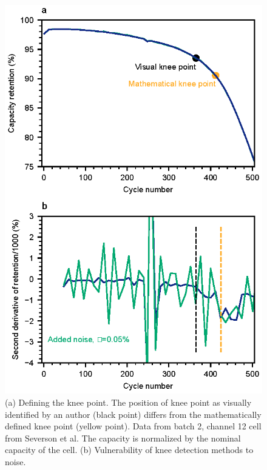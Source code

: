 \documentclass[journal=jpcl, manuscript=article, layout=onecolumn]{achemso}
\begin{document}
\begin{figure}[ht]
\centering
\includegraphics[scale=1]{figures/knee_definition.eps}
\caption{(a) Defining the knee point. The position of knee point as visually identified by an author (black point) differs from the mathematically defined knee point (yellow point). Data from batch 2, channel 12 cell from Severson et al.\cite{severson_data-driven_2019} The capacity is normalized by the nominal capacity of the cell. (b) Vulnerability of knee detection methods to noise.}
\label{fig:knee_definition3}
\end{figure}
\end{document}
